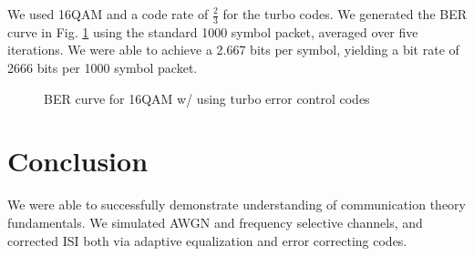 \documentclass[conference]{IEEEtran}
\begin{document}
We used 16QAM and a code rate of $\frac{2}{3}$ for the turbo codes. We generated the BER curve in Fig. \ref{turbo} using the standard 1000 symbol packet, averaged over five iterations. We were able to achieve a 2.667 bits per symbol, yielding a bit rate of 2666 bits per 1000 symbol packet.
\begin{figure}[htbp]
\caption{BER curve for 16QAM w/ using turbo error control codes}
\label{turbo}
\end{figure}

\section{Conclusion}
We were able to successfully demonstrate understanding of communication theory fundamentals. We simulated AWGN and frequency selective channels, and corrected ISI both via adaptive equalization and error correcting codes.
\end{document}
